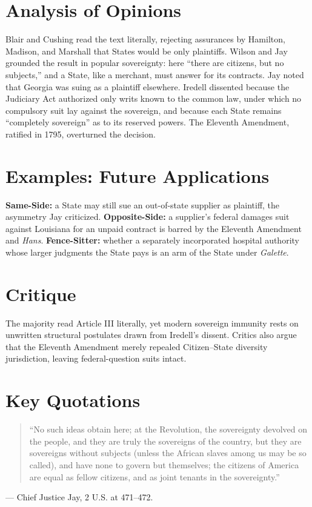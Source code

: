 \documentclass[12pt]{article}
\begin{document}
\section{Analysis of Opinions}
Blair and Cushing read the text literally, rejecting assurances by Hamilton, Madison, and Marshall that States would be only plaintiffs. Wilson and Jay grounded the result in popular sovereignty: here ``there are citizens, but no subjects,'' and a State, like a merchant, must answer for its contracts. Jay noted that Georgia was suing as a plaintiff elsewhere. Iredell dissented because the Judiciary Act authorized only writs known to the common law, under which no compulsory suit lay against the sovereign, and because each State remains ``completely sovereign'' as to its reserved powers. The Eleventh Amendment, ratified in 1795, overturned the decision.

\section{Examples: Future Applications}
\textbf{Same-Side:} a State may still sue an out-of-state supplier as plaintiff, the asymmetry Jay criticized. \textbf{Opposite-Side:} a supplier's federal damages suit against Louisiana for an unpaid contract is barred by the Eleventh Amendment and \emph{Hans}. \textbf{Fence-Sitter:} whether a separately incorporated hospital authority whose larger judgments the State pays is an arm of the State under \emph{Galette}.

\section{Critique}
The majority read Article III literally, yet modern sovereign immunity rests on unwritten structural postulates drawn from Iredell's dissent. Critics also argue that the Eleventh Amendment merely repealed Citizen--State diversity jurisdiction, leaving federal-question suits intact.

\section{Key Quotations}
\begin{quote}
``No such ideas obtain here; at the Revolution, the sovereignty devolved on the people, and they are truly the sovereigns of the country, but they are sovereigns without subjects (unless the African slaves among us may be so called), and have none to govern but themselves; the citizens of America are equal as fellow citizens, and as joint tenants in the sovereignty.''
\end{quote}
\noindent --- Chief Justice Jay, 2 U.S. at 471--472.
\end{document}

